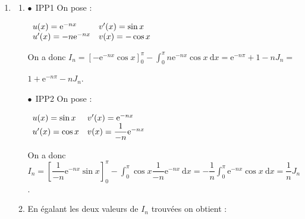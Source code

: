 \documentclass[10pt]{article}
\providecommand{\e}{{\mathrm{e}}}
\begin{document}
\begin{enumerate}
\begin{enumerate}
$\displaystyle\int_0^{\pi} 0\:\text{d}x \leqslant I_n \leqslant \displaystyle\int_0^{\pi}\e^{-n\pi}\:\text{d}x$.

\[I_n \leqslant \displaystyle\int_0^{\pi} \text{e}^{- nx}\:\text{d}x.\]
		
		\item 

Une primitive de $\text{e}^{- nx}$est $\dfrac{1}{- n}\text{e}^{- nx}$, donc pour $n \geqslant 1$, \: $\displaystyle\int_0^{\pi} \text{e}^{- nx}\:\text{d}x = \left[\dfrac{1}{- n}\text{e}^{- nx}\right]_0^{\pi} = - \dfrac 1n\left[\e^{-n \pi} - \e^0\right] = - \dfrac 1n\left[\e^{-n \pi} - 1\right] = \dfrac{1 - \e^{-n \pi}}{n}.$
		\item 
On sait que $\displaystyle\lim_{n \to + \infty}\e^{-n \pi} = 0$, donc $\displaystyle\lim_{n \to + \infty} 1 - \e^{-n \pi} = 1$ et enfin $\displaystyle\lim_{n \to + \infty}\dfrac{1 - \e^{-n \pi}}{n} = 0$.

D'après le théorème des \og gendarmes \fg{} la suite $\left(I_n\right)$ a pour limite 0.
	\end{enumerate}
\item
	\begin{enumerate}
		\item 


$\bullet~~$IPP1 On pose :

$\begin{array}{l l}
u(x) = \e^{-nx}&v'(x) = \sin x\\
u'(x) = -n\e^{-nx}&v(x) = - \cos x
\end{array}$

On a donc $I_n = \left[- \e^{-nx}\cos x\right]_0^{\pi} - \displaystyle\int_0^{\pi} n\e^{-nx}\cos x\:\text{d}x  = \e^{-n \pi} + 1 - nJ_n =$

$ 1 + \e^{-n \pi} - nJ_n$.

$\bullet~~$IPP2 On pose :

$\begin{array}{l l}
u(x) = \sin x&v'(x) = \e^{-nx}\\
u'(x) = \cos x&v(x) = \dfrac{1}{-n}\e^{-nx} 
\end{array}$

On a donc $I_n = \left[\dfrac{1}{-n} \e^{-nx}\sin x \right]_0^{\pi} - \displaystyle\int_0^{\pi}\cos x\dfrac{1}{-n}\e^{-nx}\:\text{d}x = -\dfrac 1n \displaystyle\int_0^{\pi}\e^{-nx} \cos x\:\text{d}x =  \dfrac 1n J_n$.
		\item 

En égalant les deux valeurs de $I_n$ trouvées on obtient :


\end{enumerate}
\end{enumerate}
\end{document}
